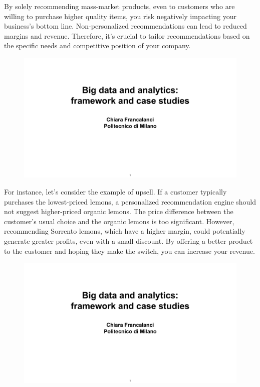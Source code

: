 By solely recommending mass-market products, even to customers who are
willing to purchase higher quality items, you risk negatively impacting
your business's bottom line. Non-personalized recommendations can lead
to reduced margins and revenue. Therefore, it's crucial to tailor
recommendations based on the specific needs and competitive position of
your company.

\begin{figure}[!h]
    \centering
    \includegraphics[page=91, trim = 0cm 0.7cm 1.5cm 1cm, clip, width=\textwidth]{images/06 - BIG_DATA.pdf}
\end{figure}

For instance, let's consider the example of upsell. If a customer
typically purchases the lowest-priced lemons, a personalized
recommendation engine should not suggest higher-priced organic lemons.
The price difference between the customer's usual choice and the organic
lemons is too significant. However, recommending Sorrento lemons, which
have a higher margin, could potentially generate greater profits, even
with a small discount. By offering a better product to the customer and
hoping they make the switch, you can increase your revenue.

\begin{figure}[!h]
    \centering
    \includegraphics[page=92, trim = 0cm 1.5cm 1.5cm 1cm, clip, width=\textwidth]{images/06 - BIG_DATA.pdf}
\end{figure}

